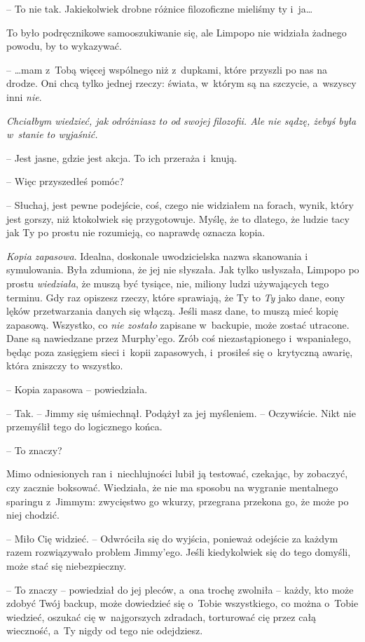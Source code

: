 \documentclass[oneside,polish,11pt,sfheadings]{mwbk}
\begin{document}
-- To nie tak. Jakiekolwiek drobne różnice filozoficzne
mieliśmy ty i~ja\ldots 

To było podręcznikowe samooszukiwanie się, ale Limpopo nie widziała
żadnego powodu, by to wykazywać.

-- \ldots  mam z~Tobą więcej wspólnego niż z~dupkami, które przyszli po nas
na drodze. Oni chcą tylko jednej rzeczy: świata, w~którym są na
szczycie, a~wszyscy inni \textit{nie}.

\textit{Chciałbym wiedzieć, jak odróżniasz to od swojej filozofii. Ale nie
sądzę, żebyś była w~stanie to wyjaśnić.}

-- Jest jasne, gdzie jest akcja. To ich przeraża i~knują.

-- Więc przyszedłeś pomóc?

-- Słuchaj, jest pewne podejście, coś, czego nie widziałem na forach,
wynik, który jest gorszy, niż ktokolwiek się przygotowuje. Myślę, że to
dlatego, że ludzie tacy jak Ty po prostu nie rozumieją, co naprawdę
oznacza kopia.

\textit{Kopia zapasowa}. Idealna, doskonale uwodzicielska nazwa skanowania
i symulowania. Była zdumiona, że jej nie słyszała. Jak tylko usłyszała,
Limpopo po prostu \textit{wiedziała}, że muszą być tysiące, nie, miliony
ludzi używających tego terminu. Gdy raz opiszesz rzeczy, które
sprawiają, że Ty to \textit{Ty} jako dane, eony lęków przetwarzania danych
się włączą. Jeśli masz dane, to muszą mieć kopię zapasową. Wszystko, co
\textit{nie zostało} zapisane w~backupie, może zostać utracone. Dane są
nawiedzane przez Murphy'ego. Zrób coś niezastąpionego i~wspaniałego,
będąc poza zasięgiem sieci i~kopii zapasowych, i~prosiłeś się o~krytyczną awarię, która zniszczy to wszystko.

-- Kopia zapasowa -- powiedziała.

-- Tak. -- Jimmy się uśmiechnął. Podążył za jej myśleniem. -- Oczywiście.
Nikt nie przemyślił tego do logicznego końca.

-- To znaczy?

Mimo odniesionych ran i~niechlujności lubił ją testować, czekając, by
zobaczyć, czy zacznie boksować. Wiedziała, że nie ma sposobu na wygranie
mentalnego sparingu z~Jimmym: zwycięstwo go wkurzy, przegrana przekona
go, że może po niej chodzić.

-- Miło Cię widzieć. -- Odwróciła się do wyjścia, ponieważ odejście za
każdym razem rozwiązywało problem Jimmy'ego. Jeśli kiedykolwiek się do
tego domyśli, może stać się niebezpieczny.

-- To znaczy -- powiedział do jej pleców, a~ona trochę zwolniła -- każdy,
kto może zdobyć Twój backup, może dowiedzieć się o~Tobie wszystkiego, co
można o~Tobie wiedzieć, oszukać cię w~najgorszych zdradach, torturować
cię przez całą wieczność, a~Ty nigdy od tego nie odejdziesz.
\end{document}
